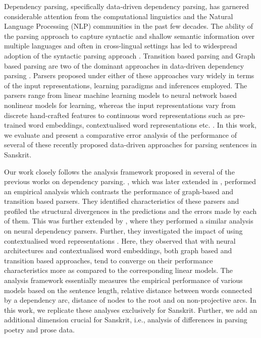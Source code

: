 \documentclass[11pt]{article}
\begin{document}
Dependency parsing, specifically data-driven dependency parsing, has garnered considerable attention from the computational linguistics and the Natural Language Processing (NLP) communities in the past few decades. The ability of the parsing approach to capture syntactic and shallow semantic information over  multiple languages and often in cross-lingual settings has led to widespread adoption of the syntactic parsing approach \cite{tiedemann-2015-cross,li-etal-2019-semi-supervised,mcdonald-etal-2013-universal}. Transition based parsing and Graph based parsing are two of the dominant approaches in data-driven dependency parsing \cite{mcdonald-nivre-2007-characterizing}. Parsers proposed under either of these approaches vary widely in terms of the input representations, learning paradigms and inferences employed. The parsers range from linear machine learning models to neural network based nonlinear models for learning, whereas the input representations vary from discrete hand-crafted features to continuous word representations such as pre-trained word embeddings, contextualised word representations etc. \cite{kulmizev-etal-2019-deep,peters-etal-2018-deep}. In this work, we evaluate and present a comparative error analysis of the performance of several of these recently proposed data-driven approaches for parsing sentences in Sanskrit. 

Our work closely follows the analysis framework proposed in several of the previous works on dependency parsing. , which was later extended in , performed an empirical analysis which contrasts the performance of graph-based and transition based parsers. They identified characteristics of these parsers  and profiled the structural divergences in the predictions and the errors made by each of them. This was further extended by , where they performed a similar analysis on neural dependency parsers. Further, they investigated the impact of using contextualised word representations \cite{peters-etal-2018-deep}. Here, they observed that with neural architectures and contextualised word embeddings, both graph based and transition based approaches, tend to converge on their performance characteristics more as compared to the corresponding linear models. The analysis framework essentially measures the empirical performance of various models based on the sentence length, relative distance between words connected by a dependency arc, distance of nodes to the root and on non-projective arcs. In this work, we replicate these analyses exclusively for Sanskrit. Further, we add an additional dimension crucial for Sanskrit, i.e., analysis of differences in parsing poetry and prose data. 
\end{document}
